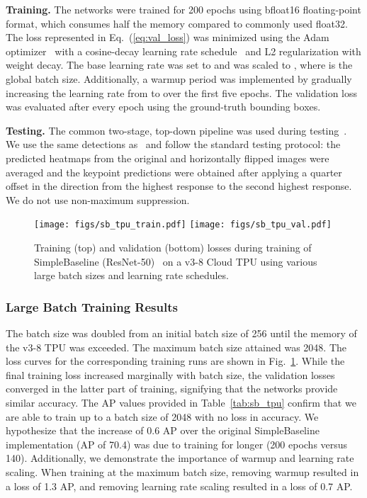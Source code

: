 \documentclass{ieeeaccess}
\begin{document}
\medskip\noindent\textbf{Training.} The networks were trained for 200 epochs using bfloat16 floating-point format, which consumes half the memory compared to commonly used float32. The loss represented in Eq.\ (\ref{eq:val_loss}) was minimized using the Adam optimizer~\cite{kingma2014adam} with a cosine-decay learning rate schedule~\cite{loshchilov2016sgdr} and L2 regularization with  weight decay. The base learning rate  was set to  and was scaled to , where  is the global batch size. Additionally, a warmup period was implemented by gradually increasing the learning rate from  to  over the first five epochs.  The validation loss was evaluated after every epoch using the ground-truth bounding boxes. 

\medskip\noindent\textbf{Testing.} The common two-stage, top-down pipeline was used during testing~\cite{chen2018cascaded, xiao2018simple, sun2019deep}. We use the same detections as~\cite{xiao2018simple, sun2019deep} and follow the standard testing protocol: the predicted heatmaps from the original and horizontally flipped images were averaged and the keypoint predictions were obtained after applying a quarter offset in the direction from the highest response to the second highest response. We do not use non-maximum suppression.

\begin{figure}[t]
\centering
    \texttt{[image: figs/sb\_tpu\_train.pdf]}
    \texttt{[image: figs/sb\_tpu\_val.pdf]}
\caption{Training (top) and validation (bottom) losses during training of SimpleBaseline (ResNet-50)~\cite{xiao2018simple} on a v3-8 Cloud TPU using various large batch sizes and learning rate schedules.}
\label{fig:sb_tpu}
\end{figure}

\subsubsection{Large Batch Training Results} 
\label{sec:sb_tpu}
The batch size was doubled from an initial batch size of 256 until the memory of the v3-8 TPU was exceeded. The maximum batch size attained was 2048. The loss curves for the corresponding training runs are shown in Fig.\ \ref{fig:sb_tpu}. While the final training loss increased marginally with batch size, the validation losses converged in the latter part of training, signifying that the networks provide similar accuracy. The AP values provided in Table~\ref{tab:sb_tpu} confirm that we are able to train up to a batch size of 2048 with no loss in accuracy. We hypothesize that the increase of 0.6 AP over the original SimpleBaseline implementation (AP of 70.4) was due to training for longer (200 epochs versus 140). Additionally, we demonstrate the importance of warmup and learning rate scaling. When training at the maximum batch size, removing warmup resulted in a loss of 1.3 AP, and removing learning rate scaling resulted in a loss of 0.7 AP.
\end{document}
